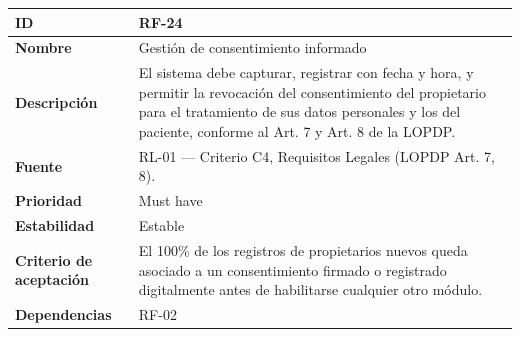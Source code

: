 \documentclass[
]{article}
\newcounter{none} %
\begin{document}
{\def\LTcaptype{none} %
\begin{longtable}[]{@{}
  >{\raggedright\arraybackslash}p{}
  >{\raggedright\arraybackslash}p{}@{}}
\toprule\noalign{}
\begin{minipage}[b]{\linewidth}\raggedright
\textbf{ID}
\end{minipage} & \begin{minipage}[b]{\linewidth}\raggedright
RF-24
\end{minipage} \\
\midrule\noalign{}
\endhead
\bottomrule\noalign{}
\endlastfoot
\textbf{Nombre} & \begin{minipage}[t]{\linewidth}\raggedright
Gestión de consentimiento informado
\end{minipage} \\
\textbf{Descripción} & \begin{minipage}[t]{\linewidth}\raggedright
El sistema debe capturar, registrar con fecha y hora, y permitir la
revocación del consentimiento del propietario para el tratamiento de sus
datos personales y los del paciente, conforme al Art. 7 y Art. 8 de la
LOPDP.
\end{minipage} \\
\textbf{Fuente} & \begin{minipage}[t]{\linewidth}\raggedright
RL-01 --- Criterio C4, Requisitos Legales (LOPDP Art. 7, 8).
\end{minipage} \\
\textbf{Prioridad} & \begin{minipage}[t]{\linewidth}\raggedright
Must have
\end{minipage} \\
\textbf{Estabilidad} & \begin{minipage}[t]{\linewidth}\raggedright
Estable
\end{minipage} \\
\textbf{Criterio de aceptación} &
\begin{minipage}[t]{\linewidth}\raggedright
El 100\% de los registros de propietarios nuevos queda asociado a un
consentimiento firmado o registrado digitalmente antes de habilitarse
cualquier otro módulo.
\end{minipage} \\
\textbf{Dependencias} & \begin{minipage}[t]{\linewidth}\raggedright
RF-02
\end{minipage} \\
\end{longtable}
}
\end{document}
